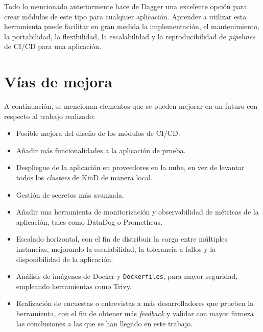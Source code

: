 Todo lo mencionado anteriormente hace de Dagger una excelente opción para crear módulos de este tipo para cualquier aplicación. Aprender a utilizar esta herramienta puede facilitar en gran medida la implementación, el mantenimiento, la portabilidad, la flexibilidad, la escalabilidad y la reproducibilidad de \textit{pipelines} de CI/CD para una aplicación.

\section{Vías de mejora}

A continuación, se mencionan elementos que se pueden mejorar en un futuro con respecto al trabajo realizado:

\begin{itemize}
  \item Posible mejora del diseño de los módulos de CI/CD.
  \item Añadir más funcionalidades a la aplicación de prueba.
  \item Despliegue de la aplicación en proveedores en la nube, en vez de levantar todos los \textit{clusters} de KinD de manera local.
  \item Gestión de secretos más avanzada.
  \item Añadir una herramienta de monitorización y observabilidad de métricas de la aplicación, tales como DataDog\cite{datadog} o Prometheus\cite{prometheus}.
  \item Escalado horizontal\cite{horizontal}, con el fin de distribuir la carga entre múltiples instancias, mejorando la escalabilidad, la tolerancia a fallos y la disponibilidad de la aplicación.
  \item Análisis de imágenes de Docker y \texttt{Dockerfiles}, para mayor seguridad, empleando herramientas como Trivy\cite{trivy}.
  \item Realización de encuestas o entrevistas a más desarrolladores que prueben la herramienta, con el fin de obtener más \textit{feedback} y validar con mayor firmeza las conclusiones a las que se han llegado en este trabajo.
\end{itemize}
